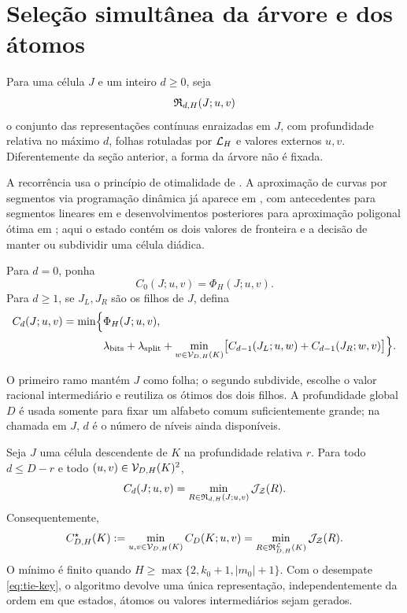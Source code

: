 \section{Seleção simultânea da árvore e dos átomos}
\label{sec:variable-dp}

Para uma célula $J$ e um inteiro $d\ge0$, seja
\[
 \mathfrak{R}_{d,H}(J;u,v)
\]
o conjunto das representações contínuas enraizadas em $J$, com profundidade
relativa no máximo $d$, folhas rotuladas por $\mathcal{L}_H$ e valores externos
$u,v$. Diferentemente da seção anterior, a forma da árvore não é fixada.

A recorrência usa o princípio de otimalidade de \citet{bellman1957}. A
aproximação de curvas por segmentos via programação dinâmica já aparece em
\citet{bellman1961}, com antecedentes para segmentos lineares em
\citet{stone1961} e desenvolvimentos posteriores para aproximação poligonal
ótima em \citet{perezvidal1994}; aqui o estado contém os dois valores de
fronteira e a decisão de manter ou subdividir uma célula diádica.

\begin{definition}
\label{def:variable-recurrence}
Para $d=0$, ponha
\begin{equation}
 C_0(J;u,v)=\Phi_H(J;u,v).
 \label{eq:variable-base}
\end{equation}
Para $d\ge1$, se $J_L,J_R$ são os filhos de $J$, defina
\begin{align}
 C_d(J;u,v)
 =\min\Bigl\{&
 \Phi_H(J;u,v),\notag\\
 &\lambda_{\rm bits}+\lambda_{\rm split}
 +\min_{w\in\mathcal{V}_{D,H}(K)}
 \bigl[C_{d-1}(J_L;u,w)+C_{d-1}(J_R;w,v)\bigr]
 \Bigr\}.
 \label{eq:variable-recurrence}
\end{align}
\end{definition}

O primeiro ramo mantém $J$ como folha; o segundo subdivide, escolhe o valor
racional intermediário e reutiliza os ótimos dos dois filhos. A profundidade
global $D$ é usada somente para fixar um alfabeto comum suficientemente
grande; na chamada em $J$, $d$ é o número de níveis ainda disponíveis.

\begin{theorem}
\label{thm:variable-correctness}
Seja $J$ uma célula descendente de $K$ na profundidade relativa $r$. Para todo
$d\le D-r$ e todo $(u,v)\in\mathcal{V}_{D,H}(K)^2$,
\begin{equation}
 C_d(J;u,v)
 =\min_{R\in\mathfrak{R}_{d,H}(J;u,v)}
 \mathcal{J}_{\mathcal Z}(R).
 \label{eq:variable-correctness}
\end{equation}
Consequentemente,
\begin{equation}
 C_{D,H}^{\star}(K)
 :=\min_{u,v\in\mathcal{V}_{D,H}(K)}C_D(K;u,v)
 =\min_{R\in\mathfrak{R}_{D,H}^{\mathcal{L}}(K)}
 \mathcal{J}_{\mathcal Z}(R).
 \label{eq:variable-global}
\end{equation}
O mínimo é finito quando
$H\ge\max\{2,k_0+1,|m_0|+1\}$. Com o desempate
\eqref{eq:tie-key}, o algoritmo devolve uma única representação, independentemente
da ordem em que estados, átomos ou valores intermediários sejam gerados.
\end{theorem}

